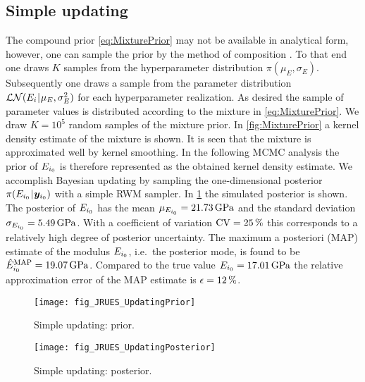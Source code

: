 \subsection{Simple updating}
The compound prior \cref{eq:MixturePrior} may not be available in analytical form, however, one can sample the prior by the method of composition \cite{MCMC:Zio2013}.
To that end one draws \(K\) samples from the hyperparameter distribution \(\pi(\mu_E,\sigma_E)\).
Subsequently one draws a sample from the parameter distribution \(\mathcal{LN}(E_i {\:\!}|{\:\!} \mu_E,\sigma_E^2)\) for each hyperparameter realization.
As desired the sample of parameter values is distributed according to the mixture in \cref{eq:MixturePrior}.
We draw \(K = 10^5\) random samples of the mixture prior.
In \cref{fig:MixturePrior} a kernel density estimate of the mixture is shown.
It is seen that the mixture is approximated well by kernel smoothing.
In the following MCMC analysis the prior of \(E_{i_0}\) is therefore represented as the obtained kernel density estimate.
We accomplish Bayesian updating by sampling the one-dimensional posterior \(\pi(E_{i_0} {\:\!}|{\:\!} \bm{y}_{i_0})\) with a simple RWM sampler.
In \cref{fig:SimpleInversion} the simulated posterior is shown.
The posterior of \(E_{i_0}\) has the mean \(\mu_{E_{\analyzed}} = \unit[21.73]{GPa}\) and the standard deviation \(\sigma_{E_{\analyzed}} = \unit[5.49]{GPa}\).
With a coefficient of variation \(\mathrm{CV} = \unit[25]{\%}\) this corresponds to a relatively high degree of posterior uncertainty.
The maximum a posteriori (MAP) estimate of the modulus \(E_{i_0}\), i.e.\ the posterior mode, is found to be \(\hat{E}_{\analyzed}^{\mathrm{MAP}} = \unit[19.07]{GPa}\).
Compared to the true value \(E_{\analyzed} = \unit[17.01]{GPa}\) the relative approximation error of the MAP estimate is \(\epsilon = \unit[12]{\%}\).
\begin{figure}[ht]
  \begin{minipage}[b]{0.49\linewidth}
    \centering
    \texttt{[image: fig\_JRUES\_UpdatingPrior]}
    \caption[Simple updating: prior]{Simple updating: prior.}
    \label{fig:MixturePrior}
  \end{minipage}%
  \hfill
  \begin{minipage}[b]{0.49\linewidth}
    \centering
    \texttt{[image: fig\_JRUES\_UpdatingPosterior]}
    \caption[Simple updating: posterior]{Simple updating: posterior.}
    \label{fig:SimpleInversion}
  \end{minipage}%
\end{figure}

